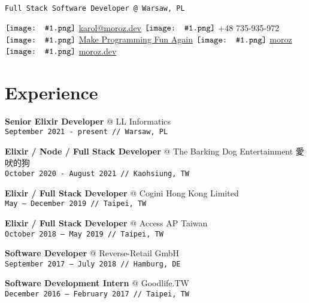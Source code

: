 \documentclass[10pt,a4paper]{article}
\author{Karol Moroz}
\makeatletter
\newcommand{\icon}[1]{$\vcenter{\hbox{\texttt{[image: \#1.png]}}}$\hspace{.2em}}
\newcommand{\experience}[4]{\par\vspace{1em}\textbf{\normalsize #1} {\color{darkgray} @ #2}\\{\footnotesize\texttt{#3 // #4}}\\[4pt]}
\makeatother
\begin{document}
\pagestyle{empty}

\texttt{Full Stack Software Developer @ Warsaw, PL}

\icon{email}
\href{mailto:karol@moroz.dev}{karol@moroz.dev} \hfill
\icon{telephone} +48 735-935-972 \hfill
\icon{youtube} \href{https://www.youtube.com/channel/UCW_YiVuoo-WG0bxQElVgxAg}{Make Programming Fun Again} \hfill
\icon{github} \href{https://github.com/moroz}{moroz} \hfill
\icon{web} \href{https://moroz.dev}{moroz.dev}

\begin{minipage}[t]{0.67\textwidth}
  \raggedright

  \section{Experience}
  \vspace*{-6pt}

  \experience{Senior Elixir Developer}{LL Informatics}{September 2021 {-} present}{Warsaw, PL}

  \experience{Elixir / Node / Full Stack Developer}{The Barking Dog Entertainment 愛吠的狗}{October 2020 {-} August 2021}{Kaohsiung, TW}

  \experience{Elixir / Full Stack Developer}{Cogini Hong Kong Limited}{May {–} December 2019}{Taipei, TW}

  \experience{Elixir / Full Stack Developer}{Access AP Taiwan}{October 2018 {–} May 2019}{Taipei, TW}

  \experience{Software Developer}{Reverse-Retail GmbH}{September 2017 {–} July 2018}{Hamburg, DE}

  \experience{Software Development Intern}{Goodlife.TW}{December 2016 {–} February 2017}{Taipei, TW}
  \vspace{1.2em}
  

\end{minipage}\hspace{0.03\textwidth}%
\end{document}
